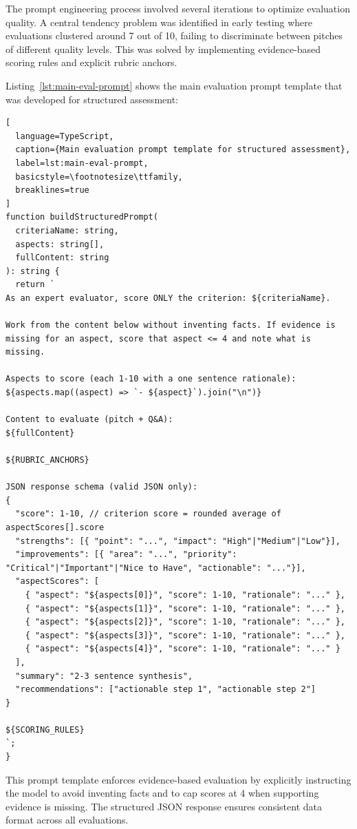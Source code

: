 The prompt engineering process involved several iterations to optimize evaluation quality. A central tendency problem was identified in early testing where evaluations clustered around 7 out of 10, failing to discriminate between pitches of different quality levels. This was solved by implementing evidence-based scoring rules and explicit rubric anchors.

Listing~\ref{lst:main-eval-prompt} shows the main evaluation prompt template that was developed for structured assessment:

\begin{lstlisting}[
  language=TypeScript,
  caption={Main evaluation prompt template for structured assessment},
  label=lst:main-eval-prompt,
  basicstyle=\footnotesize\ttfamily,
  breaklines=true
]
function buildStructuredPrompt(
  criteriaName: string,
  aspects: string[],
  fullContent: string
): string {
  return `
As an expert evaluator, score ONLY the criterion: ${criteriaName}.

Work from the content below without inventing facts. If evidence is
missing for an aspect, score that aspect <= 4 and note what is missing.

Aspects to score (each 1-10 with a one sentence rationale):
${aspects.map((aspect) => `- ${aspect}`).join("\n")}

Content to evaluate (pitch + Q&A):
${fullContent}

${RUBRIC_ANCHORS}

JSON response schema (valid JSON only):
{
  "score": 1-10, // criterion score = rounded average of aspectScores[].score
  "strengths": [{ "point": "...", "impact": "High"|"Medium"|"Low"}],
  "improvements": [{ "area": "...", "priority": "Critical"|"Important"|"Nice to Have", "actionable": "..."}],
  "aspectScores": [
    { "aspect": "${aspects[0]}", "score": 1-10, "rationale": "..." },
    { "aspect": "${aspects[1]}", "score": 1-10, "rationale": "..." },
    { "aspect": "${aspects[2]}", "score": 1-10, "rationale": "..." },
    { "aspect": "${aspects[3]}", "score": 1-10, "rationale": "..." },
    { "aspect": "${aspects[4]}", "score": 1-10, "rationale": "..." }
  ],
  "summary": "2-3 sentence synthesis",
  "recommendations": ["actionable step 1", "actionable step 2"]
}

${SCORING_RULES}
`;
}
\end{lstlisting}

This prompt template enforces evidence-based evaluation by explicitly instructing the model to avoid inventing facts and to cap scores at 4 when supporting evidence is missing. The structured JSON response ensures consistent data format across all evaluations.

